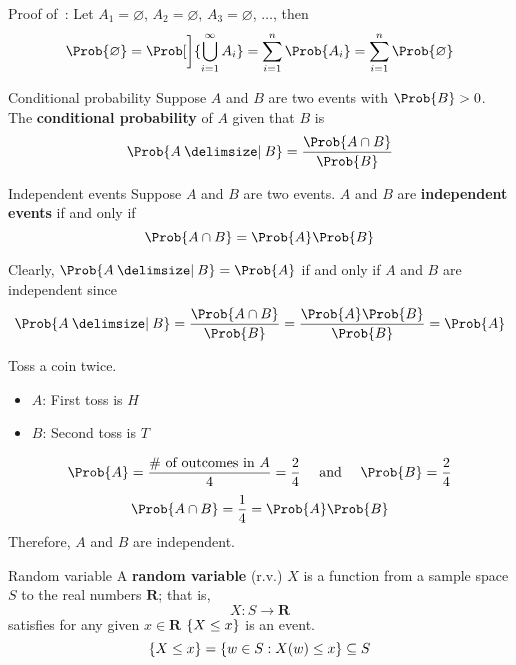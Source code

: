 \begin{Proof}{}{}
    Proof of~: Let $ A_1=\varnothing $, $ A_2=\varnothing $,
    $ A_3=\varnothing $, $ \ldots $, then
    \[ \Prob{\varnothing}=
        \Prob[\bigg]{\bigcup_{i=1}^\infty A_i}=
        \sum_{i=1}^{n} \Prob{A_i}=\sum_{i=1}^{n}\Prob{\varnothing} \]

\end{Proof}
\begin{Definition}{Conditional probability}{}
    Suppose $ A $ and $ B $ are two events with
    $ \Prob{B}>0 $. The \textbf{conditional probability}
    of $ A $ given that $ B $ is
    \[ \Prob{A\given B}=\frac{\Prob{A\cap B}}{\Prob{B}} \]
\end{Definition}

\begin{Definition}{Independent events}{}
    Suppose $ A $ and $ B $ are two events. $ A $ and
    $ B $ are \textbf{independent events} if and only if
    \[ \Prob{A\cap B}=\Prob{A}\Prob{B} \]
\end{Definition}

Clearly, $ \Prob{A\given B}=\Prob{A} $ if and only if $ A $ and $ B $ are independent since
\[ \Prob{A\given B}=\frac{\Prob{A\cap B}}{\Prob{B}}=\frac{\Prob{A}\Prob{B}}{\Prob{B}}=\Prob{A}  \]

\begin{Example}{}{}
    Toss a coin twice.
    \begin{itemize}
        \item $ A $: First toss is $ H $
        \item $ B $: Second toss is $ T $
    \end{itemize}
    \[ \Prob{A}=\frac{\text{\# of outcomes in }A}{4}=\frac{2}{4}\quad
        \text{ and }\quad \Prob{B}=\frac{2}{4} \]
    \[ \Prob{A\cap B}=\frac{1}{4}=\Prob{A}\Prob{B} \]
    Therefore, $ A $ and $ B $ are independent.
\end{Example}

\begin{Definition}{Random variable}{}
    A \textbf{random variable} (r.v.) $ X $
    is a function from a sample space $ S $ to the real numbers $ \mathbf{R} $; that is,
    \[ X:S\to \mathbf{R} \] satisfies for any given $ x\in\mathbf{R} $
    $ \{X\le x\} $ is an event.
    \[ \{X\le x\}=\{w\in S:X(w)\le x\}
        \subseteq S \]
\end{Definition}

